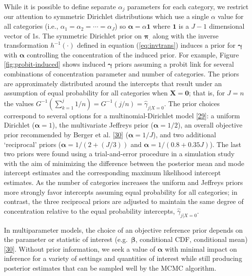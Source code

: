 \documentclass[
]{article}
\begin{document}
While it is possible to define separate \(\alpha_j\) parameters for each category, we restrict our attention to symmetric Dirichlet distributions which use a single \(\alpha\) value for all categories (i.e., \(\alpha_1 = \alpha_2 = \cdots = \alpha_J\)) so \(\boldsymbol{\alpha}=\alpha\boldsymbol{1}\) where \(\boldsymbol{1}\) is a \(J-1\) dimensional vector of 1s. The symmetric Dirichlet prior on \(\boldsymbol{\pi_{.}}\) along with the inverse transformation \(h^{-1}(\cdot)\) defined in equation (\ref{eq:invtrans}) induces a prior for \(\boldsymbol{\gamma}\) with \(\boldsymbol{\alpha}\) controlling the concentration of the induced prior. For example, Figure \ref{fig:probit-induced} shows induced \(\boldsymbol{\gamma}\) priors assuming a probit link for several combinations of concentration parameter and number of categories. The priors are approximately distributed around the intercepts that result under an assumption of equal probability for all categories when \(\boldsymbol{X}=\boldsymbol{0}\); that is, for \(J=n\) the values \(G^{-1}(\sum_{k=1}^j 1/n)=G^{-1}(j/n)=\hat{\gamma}_{j|X=0}\). The prior choices correspond to several options for a multinomial-Dirichlet model {[}\protect\hyperlink{ref-gelman_bayesian_2014}{29}{]}: a uniform Dirichlet (\(\boldsymbol{\alpha}=1\)), the multivariate Jeffreys prior (\(\boldsymbol{\alpha}=1/2\)), an overall objective prior recommended by Berger et al. {[}\protect\hyperlink{ref-berger_overall_2015}{30}{]} (\(\boldsymbol{\alpha}=1/J\)), and two additional `reciprocal' priors (\(\boldsymbol{\alpha}=1/(2+(J/3))\) and \(\boldsymbol{\alpha}=1/(0.8+0.35J)\)). The last two priors were found using a trial-and-error procedure in a simulation study with the aim of minimizing the difference between the posterior mean and mode intercept estimates and the corresponding maximum likelihood intercept estimates. As the number of categories increases the uniform and Jeffreys priors more strongly favor intercepts assuming equal probability for all categories; in contrast, the three reciprocal priors are adjusted to maintain the same degree of concentration relative to the equal probability intercepts, \(\hat{\gamma}_{j|X=0}\).

In multiparameter models, the choice of an objective reference prior depends on the parameter or statistic of interest (e.g.~\(\boldsymbol{\beta}\), conditional CDF, conditional mean) {[}\protect\hyperlink{ref-berger_overall_2015}{30}{]}. Without prior information, we seek a value of \(\boldsymbol{\alpha}\) with minimal impact on inference for a variety of settings and quantities of interest while still producing posterior estimates that can be sampled well by the MCMC algorithm.
\end{document}
